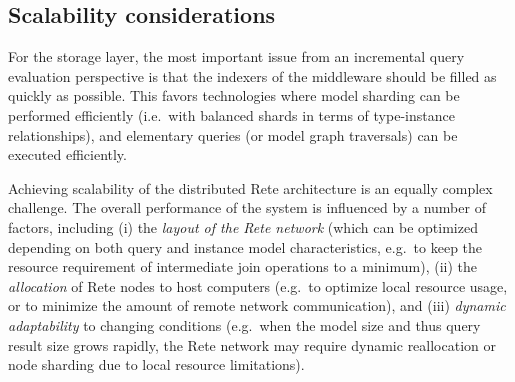 \subsection{Scalability considerations}
For the storage layer, the most important issue from an incremental query evaluation perspective is that the indexers of the middleware should be filled as quickly as possible. This favors technologies where model sharding can be performed efficiently (i.e.\ with balanced shards in terms of type-instance relationships), and elementary queries (or model graph traversals) can be executed efficiently.

Achieving scalability of the distributed Rete architecture is an equally complex challenge. The overall performance of the system is influenced by a number of factors, including (i) the \emph{layout of the Rete network} (which can be optimized depending on both query and instance model characteristics, e.g.\ to keep the resource requirement of intermediate join operations to a minimum), (ii) the \emph{allocation} of Rete nodes to host computers (e.g.\ to optimize local resource usage, or to minimize the amount of remote network communication), and (iii) \emph{dynamic adaptability} to changing conditions (e.g.\ when the model size and thus query result size grows rapidly, the Rete network may require dynamic reallocation or node sharding due to local resource limitations).